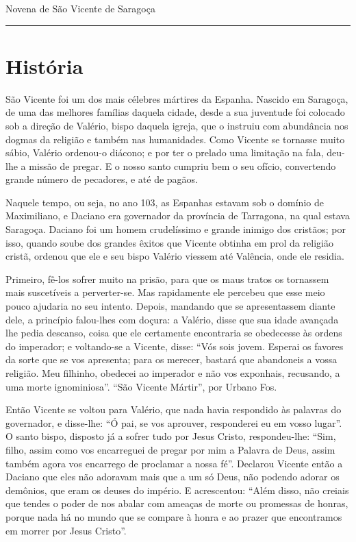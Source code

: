 \documentclass[a4paper,14pt]{extarticle} \usepackage[utf8]{inputenc}
\begin{document}



\begin{center}
  {\huge Novena de São Vicente de Saragoça}
\end{center}



\noindent\rule{\textwidth}{0.4pt}
\tableofcontents
\thispagestyle{empty}



\section{História}

São Vicente foi um dos mais célebres mártires da Espanha. Nascido em Saragoça, de uma das melhores famílias daquela cidade, desde a sua juventude foi colocado sob a direção de Valério, bispo daquela igreja, que o instruiu com abundância nos dogmas da religião e também nas humanidades. Como Vicente se tornasse muito sábio, Valério ordenou-o diácono; e por ter o prelado uma limitação na fala, deu-lhe a missão de pregar. E o nosso santo cumpriu bem o seu ofício, convertendo grande número de pecadores, e até de pagãos.

Naquele tempo, ou seja, no ano 103, as Espanhas estavam sob o domínio de Maximiliano, e Daciano era governador da província de Tarragona, na qual estava Saragoça. Daciano foi um homem crudelíssimo e grande inimigo dos cristãos; por isso, quando soube dos grandes êxitos que Vicente obtinha em prol da religião cristã, ordenou que ele e seu bispo Valério viessem até Valência, onde ele residia. 

Primeiro, fê-los sofrer muito na prisão, para que os maus tratos os tornassem mais suscetíveis a perverter-se. Mas rapidamente ele percebeu que esse meio pouco ajudaria no seu intento. Depois, mandando que se apresentassem diante dele, a princípio falou-lhes com doçura: a Valério, disse que sua idade avançada lhe pedia descanso, coisa que ele certamente encontraria se obedecesse às ordens do imperador; e voltando-se a Vicente, disse: “Vós sois jovem. Esperai os favores da sorte que se vos apresenta; para os merecer, bastará que abandoneis a vossa religião. Meu filhinho, obedecei ao imperador e não vos exponhais, recusando, a uma morte ignominiosa”.
“São Vicente Mártir”, por Urbano Fos.

Então Vicente se voltou para Valério, que nada havia respondido às palavras do governador, e disse-lhe: “Ó pai, se vos aprouver, responderei eu em vosso lugar”. O santo bispo, disposto já a sofrer tudo por Jesus Cristo, respondeu-lhe: “Sim, filho, assim como vos encarreguei de pregar por mim a Palavra de Deus, assim também agora vos encarrego de proclamar a nossa fé”. Declarou Vicente então a Daciano que eles não adoravam mais que a um só Deus, não podendo adorar os demônios, que eram os deuses do império. E acrescentou: “Além disso, não creiais que tendes o poder de nos abalar com ameaças de morte ou promessas de honras, porque nada há no mundo que se compare à honra e ao prazer que encontramos em morrer por Jesus Cristo”. 
\end{document}
